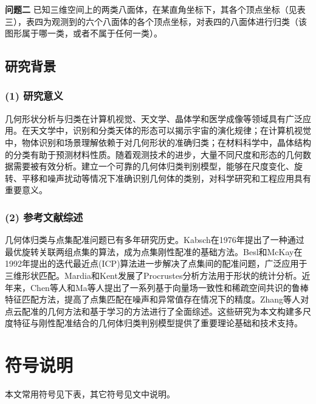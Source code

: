 \textbf{问题二} 已知三维空间上的两类八面体，在某直角坐标下，其各个顶点坐标（见表三），表四为观测到的六个八面体的各个顶点坐标，对表四的八面体进行归类（该图形属于哪一类，或者不属于任何一类）。

\subsection{研究背景}
\subsubsection*{(1) 研究意义}
几何形状分析与归类在计算机视觉、天文学、晶体学和医学成像等领域具有广泛应用。在天文学中，识别和分类天体的形态可以揭示宇宙的演化规律；在计算机视觉中，物体识别和场景理解依赖于对几何形状的准确归类；在材料科学中，晶体结构的分类有助于预测材料性质。随着观测技术的进步，大量不同尺度和形态的几何数据需要被有效分析。建立一个可靠的几何体归类判别模型，能够在尺度变化、旋转、平移和噪声扰动等情况下准确识别几何体的类别，对科学研究和工程应用具有重要意义。

\subsubsection*{(2) 参考文献综述}
几何体归类与点集配准问题已有多年研究历史。Kabsch\cite{kabsch1976solution}在1976年提出了一种通过最优旋转关联两组点集的算法，成为点集刚性配准的基础方法。Besl和McKay\cite{besl1992method}在1992年提出的迭代最近点(ICP)算法进一步解决了点集间的配准问题，广泛应用于三维形状匹配。Mardia和Kent\cite{mardia1987procrustes}发展了Procrustes分析方法用于形状的统计分析。近年来，Chen等人\cite{chen2015robust}和Ma等人\cite{ma2014robust}提出了一系列基于向量场一致性和稀疏空间共识的鲁棒特征匹配方法，提高了点集匹配在噪声和异常值存在情况下的精度。Zhang等人\cite{zhang2020recent}对点云配准的几何方法和基于学习的方法进行了全面综述。这些研究为本文构建多尺度特征与刚性配准结合的几何体归类判别模型提供了重要理论基础和技术支持。

\section{符号说明}
本文常用符号见下表，其它符号见文中说明。

\begingroup %
\setlength{\heavyrulewidth}{2.5pt} %

